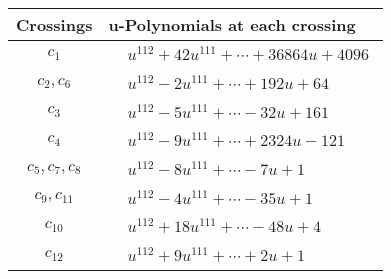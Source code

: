 \documentclass[1p]{elsarticle_modified}
\theoremstyle{definition}
\begin{document}
\begin{tabular}{m{50pt}|m{274pt}}
Crossings & \hspace{64pt}u-Polynomials at each crossing \\
\hline $$\begin{aligned}c_{1}\end{aligned}$$&$\begin{aligned}
&u^{112}+42 u^{111}+\cdots+36864 u+4096
\end{aligned}$\\
\hline $$\begin{aligned}c_{2},c_{6}\end{aligned}$$&$\begin{aligned}
&u^{112}-2 u^{111}+\cdots+192 u+64
\end{aligned}$\\
\hline $$\begin{aligned}c_{3}\end{aligned}$$&$\begin{aligned}
&u^{112}-5 u^{111}+\cdots-32 u+161
\end{aligned}$\\
\hline $$\begin{aligned}c_{4}\end{aligned}$$&$\begin{aligned}
&u^{112}-9 u^{111}+\cdots+2324 u-121
\end{aligned}$\\
\hline $$\begin{aligned}c_{5},c_{7},c_{8}\end{aligned}$$&$\begin{aligned}
&u^{112}-8 u^{111}+\cdots-7 u+1
\end{aligned}$\\
\hline $$\begin{aligned}c_{9},c_{11}\end{aligned}$$&$\begin{aligned}
&u^{112}-4 u^{111}+\cdots-35 u+1
\end{aligned}$\\
\hline $$\begin{aligned}c_{10}\end{aligned}$$&$\begin{aligned}
&u^{112}+18 u^{111}+\cdots-48 u+4
\end{aligned}$\\
\hline $$\begin{aligned}c_{12}\end{aligned}$$&$\begin{aligned}
&u^{112}+9 u^{111}+\cdots+2 u+1
\end{aligned}$\\
\hline
\end{tabular}\\~\\
\end{document}
